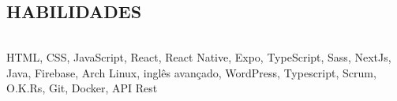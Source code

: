 \begin{framed}
    \section{HABILIDADES}
    \begin{tabular}{r|p{5cm}}
    \end{tabular}
    HTML, CSS, JavaScript, React, React Native, Expo, TypeScript, Sass,  NextJs, Java, Firebase, Arch Linux, inglês avançado, WordPress, Typescript, Scrum, O.K.Rs, Git, Docker, API Rest
  \end{framed}
